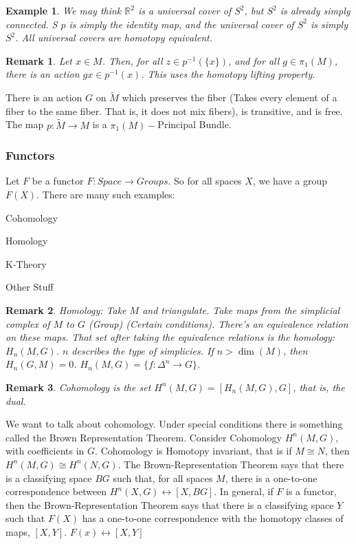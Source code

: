 \documentclass[oneside]{book}
\theoremstyle{mystyle}
\newtheorem{example}{Example}[section]
\newtheorem{remark}{Remark}[section]
\begin{document}
\begin{example}
We may think $\mathbb{R}^2$ is a universal cover of $S^{2}$, but $S^{2}$ is already simply connected. S $p$ is simply the identity map, and the universal cover of $S^{2}$ is simply $S^{2}$. All universal covers are homotopy equivalent.
\end{example}
\begin{remark}
Let $x\in M$. Then, for all $z\in p^{-1}(\{x\})$, and for all $g\in \pi_{1}(M)$, there is an action $gx\in p^{-1}(x)$. This uses the homotopy lifting property.
\end{remark}
There is an action $G$ on $\tilde{M}$ which preserves the fiber (Takes every element of a fiber to the same fiber. That is, it does not mix fibers), is transitive, and is free. The map $p:\tilde{M}\rightarrow M$ is a $\pi_{1}(M)-$Principal Bundle.
\subsubsection{Functors}
Let $F$ be a functor $F:\textit{Space}\rightarrow \textit{Groups}$. So for all spaces $X$, we have a group $F(X)$. There are many such examples:
\begin{itemize}
    \begin{multicols}{4}
        \item Cohomology
        \item Homology
        \item K-Theory
        \item Other Stuff
    \end{multicols}
\end{itemize}
\begin{remark}
Homology: Take $M$ and triangulate. Take maps from the simplicial complex of $M$ to $G$ (Group) (Certain conditions). There's an equivalence relation on these maps. That set after taking the equivalence relations is the homology: $H_{n}(M,G)$. $n$ describes the type of simplicies. If $n > \dim(M)$, then $H_{n}(G,M) = 0$. $H_{n}(M,G) = \{f:\Delta^{n}\rightarrow G\}$.
\end{remark}
\begin{remark}
Cohomology is the set $H^{n}(M,G) = [H_{n}(M,G),G]$, that is, the \textit{dual}.
\end{remark}
We want to talk about cohomology. Under special conditions there is something called the Brown Representation Theorem. Consider Cohomology $H^{n}(M,G)$, with coefficients in $G$. Cohomology is Homotopy invariant, that is if $M \cong N$, then $H^{n}(M,G) \cong H^{n}(N,G)$. The Brown-Representation Theorem says that there is a classifying space $BG$ such that, for all spaces $M$, there is a one-to-one correspondence between $H^{n}(X,G) \leftrightarrow [X,BG]$. In general, if $F$ is a functor, then the Brown-Representation Theorem says that there is a classifying space $Y$ such that $F(X)$ has a one-to-one correspondence with the homotopy classes of maps, $[X,Y]$. $F(x) \leftrightarrow [X,Y]$
\end{document}
